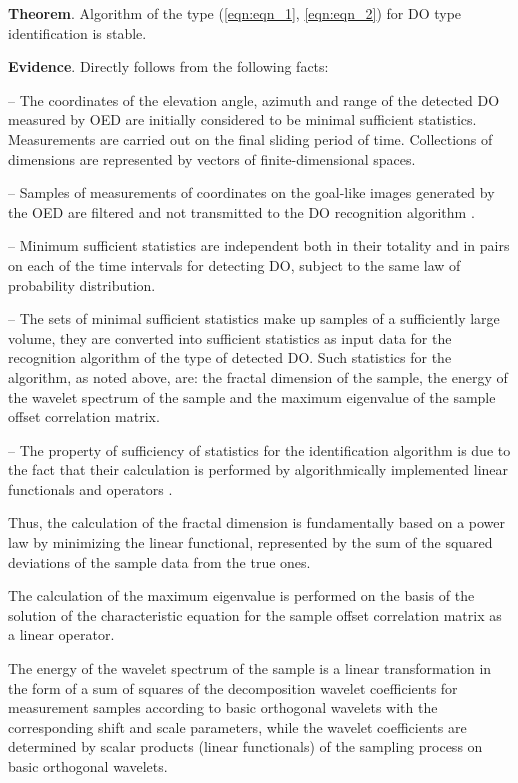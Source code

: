 {\bf Theorem}. Algorithm of the type (\ref{eqn:eqn_1}, \ref{eqn:eqn_2}) for DO type identification is stable.

{\bf Evidence}. Directly follows from the following facts:

-- The coordinates of the elevation angle, azimuth and range of the detected DO measured by OED are initially considered to be minimal sufficient statistics.
Measurements are carried out on the final sliding period of time.
Collections of dimensions are represented by vectors of finite-dimensional spaces.

-- Samples of measurements of coordinates on the goal-like images generated by the OED are filtered and not transmitted to the DO recognition algorithm \cite{bib_01}.
 
-- Minimum sufficient statistics are independent both in their totality and in pairs on each of the time intervals for detecting DO, subject to the same law of probability distribution.

-- The sets of minimal sufficient statistics make up samples of a sufficiently large volume, they are converted into sufficient statistics as input data for the recognition algorithm of the type of detected DO.
Such statistics for the algorithm, as noted above, are: the fractal dimension of the sample, the energy of the wavelet spectrum of the sample and the maximum eigenvalue of the sample offset correlation matrix.

-- The property of sufficiency of statistics for the identification algorithm is due to the fact that their calculation is performed by algorithmically implemented linear functionals and operators \cite{bib_01}.
 
Thus, the calculation of the fractal dimension is fundamentally based on a power law by minimizing the linear functional, represented by the sum of the squared deviations of the sample data from the true ones.

The calculation of the maximum eigenvalue is performed on the basis of the solution of the characteristic equation for the sample offset correlation matrix as a linear operator. 

The energy of the wavelet spectrum of the sample is a linear transformation in the form of a sum of squares of the decomposition wavelet coefficients for measurement samples according to basic orthogonal wavelets with the corresponding shift and scale parameters, while the wavelet coefficients are determined by scalar products (linear functionals) of the sampling process on basic orthogonal wavelets.

